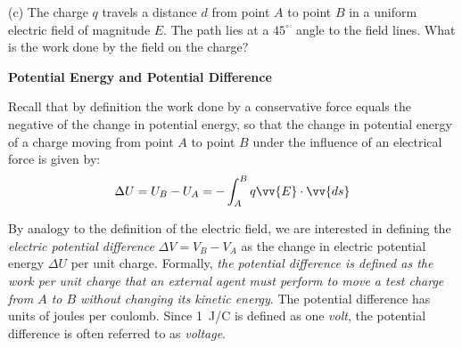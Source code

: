 \pagebreak[2]
(c) The charge $q$ travels a distance $d$ from point $A$ to point $B$ in a
uniform electric field of magnitude $E$. The path lies at a $45^{\circ}$~angle 
to the field lines. What is the work done by the field on the
charge?

\vspace{0.3cm}
{\centering {} \par}
\answerspace{0.5cm}

\textbf{Potential Energy and Potential Difference}

Recall that by definition the work done by a conservative force equals
the negative of the change in potential energy, so that the change
in potential energy of a charge moving from point $A$ to point $B$ under
the influence of an electrical force is given by:
\begin{equation*}
\Delta U=U_{B}-U_{A}=-\int ^{B}_{A}q\vv{E}\cdot \vv{ds}
\end{equation*}

By analogy to the definition of the electric field, we are interested
in defining the \emph{electric potential difference} $\Delta V=V_{B}-V_{A}$
as the change in electric potential energy $\Delta U$ per
unit charge. Formally, \emph{the potential difference is defined as
the work per unit charge that an external agent must perform to move
a test charge from $A$ to $B$ without changing its kinetic energy}. The
potential difference has units of joules per coulomb. Since 1~J/C
is defined as one \emph{volt}, the potential difference is often referred
to as \emph{voltage}.

